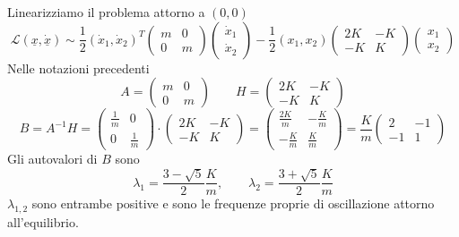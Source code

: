 \begin{example}{}
Linearizziamo il problema attorno a \((0,0)\)
\[
\mathcal{L}(\underline{x},\dot{\underline{x}})
\sim
\frac{1}{2}
(\dot{x}_1,\dot{x}_2)^T
\begin{pmatrix}
m & 0\\
0 & m
\end{pmatrix}
\begin{pmatrix}
\dot{x}_1\\
\dot{x}_2
\end{pmatrix}
-
\frac{1}{2}
(x_1,x_2)
\begin{pmatrix}
2K & -K\\
-K & K
\end{pmatrix}
\begin{pmatrix}
x_1\\
x_2
\end{pmatrix}
\]
Nelle notazioni precedenti
\[
A=
\begin{pmatrix}
m & 0\\
0 & m
\end{pmatrix}
\qquad
H=
\begin{pmatrix}
2K & -K\\
-K & K
\end{pmatrix}
\]
\[
B=A^{-1}H
=
\begin{pmatrix}
\frac{1}{m} & 0\\
0 & \frac{1}{m}
\end{pmatrix}
\cdot
\begin{pmatrix}
2K & -K\\
-K & K
\end{pmatrix}
=
\begin{pmatrix}
\frac{2K}{m} & -\frac{K}{m}\\
-\frac{K}{m} & \frac{K}{m}
\end{pmatrix}
=
\frac{K}{m}
\begin{pmatrix}
2 & -1\\
-1 & 1
\end{pmatrix}
\]
Gli autovalori di \(B\) sono
\[
\lambda_1=\frac{3-\sqrt{5}}{2}\frac{K}{m},
\qquad
\lambda_2=\frac{3+\sqrt{5}}{2}\frac{K}{m}
\]
\(\lambda_{1,2}\) sono entrambe positive e sono le frequenze proprie di oscillazione attorno all'equilibrio.
\end{example}

